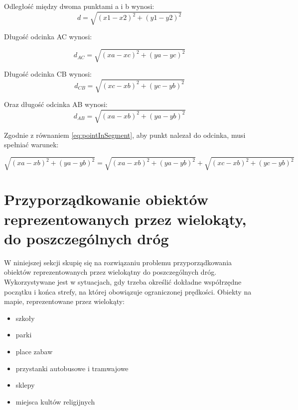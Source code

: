 Odległość między dwoma punktami a i b wynosi:
\begin{equation}
d = \sqrt{(x1 - x2)^2 + (y1 - y2)^2}
\end{equation}\newline

Długość odcinka AC wynosi:

\begin{equation} \label{eq:distanceBetweenTwoPointAC}
d_{AC} = \sqrt{(xa - xc)^2 + (ya - yc)^2}
\end{equation}\newline

Długość odcinka CB wynosi:
\begin{equation} \label{eq:distanceBetweenTwoPointCB}
d_{CB} = \sqrt{(xc - xb)^2 + (yc - yb)^2}
\end{equation}\newline

Oraz długość odcinka AB wynosi:
\begin{equation}
d_{AB} = \sqrt{(xa - xb)^2 + (ya - yb)^2}
\end{equation}\newline

Zgodnie z równaniem \ref{eq:pointInSegment}, aby punkt nalezał do odcinka, musi spełniać warunek:

\begin{equation}
\sqrt{(xa - xb)^2 + (ya - yb)^2} = \sqrt{(xa - xb)^2 + (ya - yb)^2} + \sqrt{(xc - xb)^2 + (yc - yb)^2}
\end{equation}\newline


\section{Przyporządkowanie obiektów reprezentowanych przez wielokąty, do poszczególnych dróg}
\label{sec:polygonLineDistance}

W niniejszej sekcji skupię się na rozwiązaniu problemu przyporządkowania obiektów reprezentowanych przez wielokątny do poszczególnych dróg. Wykorzystywane jest w sytuacjach, gdy trzeba określić dokładne współrzędne początku i końca strefy, na której obowiązuje ograniczonej prędkości. Obiekty na mapie, reprezentowane przez wielokąty:
\begin{itemize}
\item szkoły
\item parki
\item place zabaw
\item przystanki autobusowe i tramwajowe
\item sklepy
\item miejsca kultów religijnych
\end{itemize}

